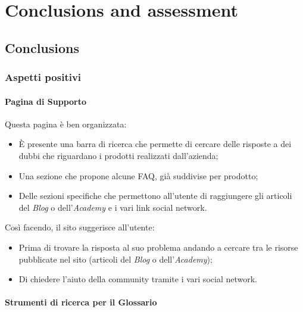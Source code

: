 \section{Conclusions and assessment}

\subsection{Conclusions}

\subsubsection{Aspetti positivi}

\paragraph{Pagina di Supporto}

Questa pagina è ben organizzata:
\begin{itemize}
  \item È presente una barra di ricerca che permette di cercare delle 
  risposte a dei dubbi che riguardano i prodotti realizzati dall'azienda;

  \item Una sezione che propone alcune FAQ, già suddivise per prodotto;
  
  \item Delle sezioni specifiche che permettono all'utente di raggiungere 
  gli articoli del \textit{Blog} o dell'\textit{Academy} e i vari link 
  social network.
\end{itemize}
Così facendo, il sito suggerisce all'utente:
\begin{itemize}
  \item Prima di trovare la risposta al suo problema andando a cercare 
  tra le risorse pubblicate nel sito (articoli del \textit{Blog} o 
  dell'\textit{Academy});

  \item Di chiedere l'aiuto della community tramite i vari social network.
\end{itemize}


\paragraph{Strumenti di ricerca per il Glossario}

